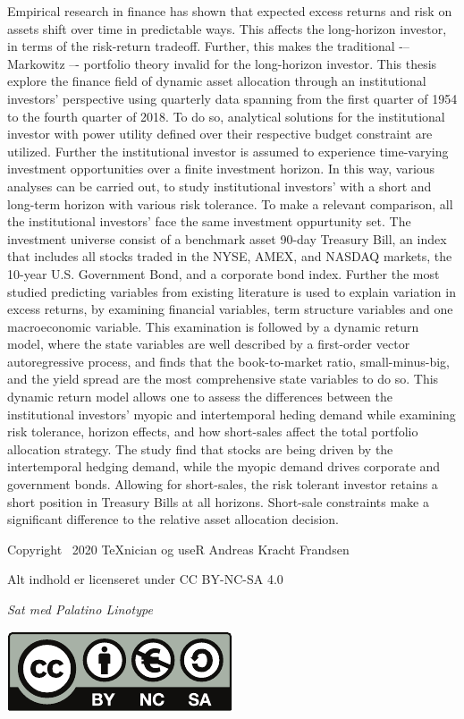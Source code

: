 \begin{titlingpage}
\begin{center}
\begin{minipage}{16cm}
Empirical research in finance has shown that expected excess returns and risk
on assets shift over time in predictable ways. This affects the long-horizon investor, in terms of the risk-return tradeoff. Further, this makes the traditional -– Markowitz –- portfolio theory invalid for the long-horizon investor. This thesis explore the finance field of dynamic asset allocation through an institutional investors' perspective using quarterly data spanning from the first quarter of 1954 to the fourth quarter of 2018. To do so, analytical solutions for the institutional investor with power utility defined over their respective budget constraint are utilized. Further the institutional investor is assumed to experience time-varying investment opportunities over a finite investment horizon. In this way, various analyses can be carried out, to study institutional investors' with a short and long-term horizon with various risk tolerance. To make a relevant comparison, all the institutional investors' face the same investment oppurtunity set. The investment universe consist of a benchmark asset 90-day Treasury Bill, an index that includes all stocks traded in the NYSE, AMEX, and NASDAQ markets, the 10-year U.S. Government Bond, and a corporate bond index. Further the most studied predicting variables from existing literature is used to explain variation in excess returns, by examining financial variables, term structure variables and one macroeconomic variable. This examination is followed by a dynamic return model, where the state variables are well described by a first-order vector autoregressive process, and finds that the book-to-market ratio, small-minus-big, and the yield spread are the most comprehensive state variables to do so. This dynamic return model allows one to assess the differences between the institutional investors' myopic and intertemporal heding demand while examining risk tolerance, horizon effects, and how short-sales affect the total portfolio allocation strategy. The study find that stocks are being driven by the intertemporal hedging demand, while the myopic demand drives corporate and government bonds. Allowing for short-sales, the risk tolerant investor retains a short position in Treasury Bills at all horizons. Short-sale constraints make a significant difference to the relative asset allocation decision.
\end{minipage}
\end{center}
\end{titlingpage}

\newpage

\vspace*{\fill}

Copyright \textcopyright\, 2020 \TeX nician og useR Andreas Kracht Frandsen

Alt indhold er licenseret under CC BY-NC-SA 4.0

\textit{Sat med Palatino Linotype}

\includegraphics[width=0.15\linewidth]{latex/bync}
\newpage